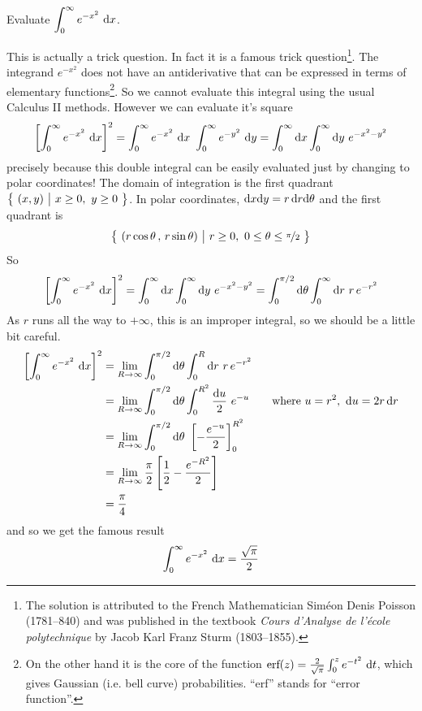 \begin{eg}\label{eg change to polar B}
Evaluate $\displaystyle\int_0^\infty e^{-x^2}\ \dee{x}$.

\soln
This is actually a trick question. In fact it is a famous trick 
question\footnote{The solution is attributed to the French Mathematician
Sim\'eon Denis Poisson (1781--840) and was published in the textbook
\emph{Cours d'Analyse de l'\'ecole polytechnique} by 
Jacob Karl Franz Sturm (1803--1855).}.
The integrand $e^{-x^2}$ does not have an antiderivative that can 
be expressed in terms of elementary functions\footnote{On the other hand it is the core of the function 
$\text{erf}(z)=\frac{2}{\sqrt{\pi}}\int_0^z e^{-t^2}\ \mathrm{d}t$, which 
gives Gaussian (i.e. bell curve) probabilities.
``erf'' stands for ``error function''.}.
So we cannot evaluate this integral using the usual Calculus II methods. 
However we can evaluate it's square
\begin{align*}
\left[\int_0^\infty e^{-x^2}\ \mathrm{d}x\right]^2
=\int_0^\infty e^{-x^2}\ \mathrm{d}x\   \int_0^\infty e^{-y^2}\ \mathrm{d}y
=\int_0^\infty \mathrm{d}x \int_0^\infty \mathrm{d}y\ e^{-x^2-y^2}
\end{align*}
precisely because this double integral can be easily 
evaluated just by changing to polar coordinates!
The domain of integration is the first quadrant
$\big\{ \ (x,y)\ \big|\ x\ge 0,\ y\ge 0\ \big\}$. In polar coordinates, 
$\mathrm{d}x\mathrm{d}y = r\,\mathrm{d}r\mathrm{d}\theta$ and the first  quadrant is 
\begin{equation*}
\Set{(r\cos\theta\,,\,r\sin\theta)}{r\ge 0,\ 0\le\theta\le \nicefrac{\pi}{2}}
\end{equation*}
So
\begin{align*}
\left[\int_0^\infty e^{-x^2}\ \mathrm{d}x\right]^2
=\int_0^\infty\mathrm{d}x\int_0^\infty\mathrm{d}y\ e^{-x^2-y^2}
=\int_0^{\pi/2}\mathrm{d}\theta\int_0^\infty \mathrm{d}r\ r\, e^{-r^2}
\end{align*}
As $r$ runs all the way to $+\infty$, this is an improper integral,
so we should be a little bit careful.
\begin{align*}
\left[\int_0^\infty e^{-x^2}\ \mathrm{d}x\right]^2
&=\lim_{R\rightarrow\infty}
            \int_0^{\pi/2}\mathrm{d}\theta\int_0^R \mathrm{d}r\ r\, e^{-r^2} \\
&=\lim_{R\rightarrow\infty}
    \int_0^{\pi/2}\mathrm{d}\theta\int_0^{R^2} \frac{\mathrm{d}u}{2}\ e^{-u} \qquad
   \text{where } u= r^2,\ \mathrm{d}u =2r\,\mathrm{d}r \\
&=\lim_{R\rightarrow\infty}
    \int_0^{\pi/2}\mathrm{d}\theta\ \left[-\frac{e^{-u}}{2}\right]_0^{R^2} \\
&=\lim_{R\rightarrow\infty} \frac{\pi}{2}                  
                 \left[\frac{1}{2}-\frac{e^{-R^2}}{2}\right] \\
&=\frac{\pi}{4}
\end{align*}
and so we get the famous result
\begin{align*}
\int_0^\infty e^{-x^2}\ \mathrm{d}x =\frac{\sqrt{\pi}}{2}
\end{align*}


\end{eg}
